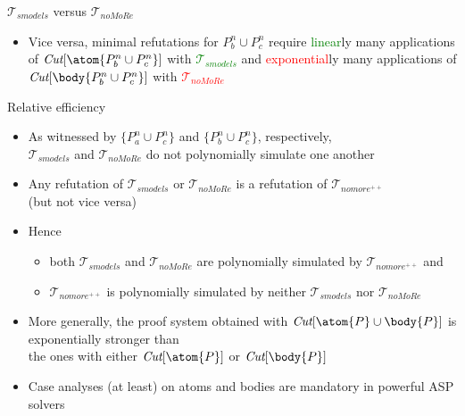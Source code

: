 \begin{frame}{${\mathcal{T}}_{\textit{smodels}}$ versus ${\mathcal{T}}_{\textit{noMoRe}}$}
\begin{itemize}
    \pause[4]
    the number of applications of
    \textcolor<4,7>{green}{$\textit{Cut}[\body{P^n_a\cup P^n_c}]$} with
    \textcolor<4>{green}{${\mathcal{T}}_{\textit{noMoRe}}$} is
    \textcolor<4,7>{green}{linear} in $n$,
    whereas
    \textcolor<4>{red}{${\mathcal{T}}_{\textit{smodels}}$} requires
    \textcolor<4,8>{red}{exponential}ly many applications of
    \textcolor<4,8>{red}{$\textit{Cut}[\atom{P^n_a\cup P^n_c}]$}
  \item <5-> Vice versa, \alert<5>{minimal refutations} for \alert<5>{$P^n_b\cup P^n_c$}
    \pause[6]
    require
    \textcolor<6,8>{green}{linear}ly many applications of
    \textcolor<6,8>{green}{$\textit{Cut}[\atom{P^n_b\cup P^n_c}]$} with
    \textcolor<6>{green}{${\mathcal{T}}_{\textit{smodels}}$}
    and
    \textcolor<6,7>{red}{exponential}ly many applications of
    \textcolor<6,7>{red}{$\textit{Cut}[\body{P^n_b\cup P^n_c}]$} with
    \textcolor<6>{red}{${\mathcal{T}}_{\textit{noMoRe}}$}
\end{itemize}
\end{frame}
\begin{frame}{Relative efficiency}
  \begin{itemize}
  \item<1-> As witnessed by $\{P^n_a\cup P^n_c\}$ and $\{P^n_b\cup P^n_c\}$, respectively, \\
    ${\mathcal{T}}_{\textit{smodels}}$ and ${\mathcal{T}}_{\textit{noMoRe}}$ do not polynomially
    simulate one another
  \item<2-> Any refutation of ${\mathcal{T}}_{\textit{smodels}}$ or
    ${\mathcal{T}}_{\textit{noMoRe}}$ is a refutation of ${\mathcal{T}}_{\textit{nomore}^{++}}$ \\
    (but not vice versa)
  \item<3-> Hence
    \begin{itemize}\normalsize
    \item both ${\mathcal{T}}_{\textit{smodels}}$ and ${\mathcal{T}}_{\textit{noMoRe}}$
      are polynomially simulated by ${\mathcal{T}}_{\textit{nomore}^{++}}$ and
    \item ${\mathcal{T}}_{\textit{nomore}^{++}}$ is polynomially simulated
      by neither ${\mathcal{T}}_{\textit{smodels}}$ nor ${\mathcal{T}}_{\textit{noMoRe}}$
    \end{itemize}
     \medskip
  \item<4-> More generally,
    the proof system obtained with $\textit{Cut}[\atom{P}\cup\body{P}]$ is \alert{exponentially stronger} than
    \\
    the ones with either $\textit{Cut}[\atom{P}]$ or $\textit{Cut}[\body{P}]$
  \item<5-> Case analyses (at least) on atoms and bodies are mandatory in powerful ASP solvers
\end{itemize}
\end{frame}
